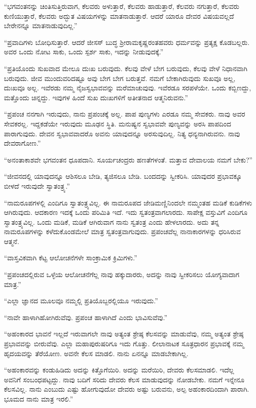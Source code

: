  “ಭಗವಂತನನ್ನು ಚಿಂತಿಸುತ್ತಿರುವಾಗ, ಕೆಲವರು ಅಳುತ್ತಾರೆ, ಕೆಲವರು ಹಾಡುತ್ತಾರೆ, ಕೆಲವರು ನಗುತ್ತಾರೆ, ಕೆಲವರು ಕುಣಿಯುತ್ತಾರೆ, ಕೆಲವರು ಅದ್ಭುತ ವಿಷಯಗಳನ್ನು ಮಾತನಾಡುತ್ತಾರೆ. ಆದರೆ ಯಾರೂ ದೇವರ ವಿಷಯವಲ್ಲದೆ ಬೇರೇನನ್ನೂ ಮಾತನಾಡುವುದಿಲ್ಲ.” 

 “ಪ್ರವಾದಿಗಳು ಬೋಧಿಸುತ್ತಾರೆ. ಆದರೆ ಜೀಸಸ್ ಬುದ್ಧ ಶ‍್ರೀರಾಮಕೃಷ್ಣರಂತಹ\break ವರು ಧರ್ಮವನ್ನು ಪ್ರತ್ಯಕ್ಷ ಕೊಡಬಲ್ಲರು. ಅವರ ಒಂದು ನೋಟ ಸಾಕು, ಒಂದು ಸ್ಪರ್ಶ ಸಾಕು, ಇದನ್ನು ನೀಡುವುದಕ್ಕೆ.” 

 “ಪ್ರತಿಯೊಂದು ಸುಖವಾದ ಮೇಲೂ ದುಃಖ ಬರುವುದು. ಕೆಲವು ವೇಳೆ ಬೇಗ ಬರುವುದು, ಕೆಲವು ವೇಳೆ ನಿಧಾನವಾಗಿ ಬರುವುದು. ಜೀವ ಮುಂದುವರಿದಷ್ಟೂ ಅವು ಬೇಗ ಬೇಗ ಬರುತ್ತವೆ. ನಮಗೆ ಬೇಕಾಗಿರುವುದು ಸುಖವೂ ಅಲ್ಲ, ದುಃಖವೂ ಅಲ್ಲ. ಇವೆರಡು ನಮ್ಮ ನೈಜಸ್ವಭಾವವನ್ನು ಮರೆಮಾಚುವುವು. ಇವೆರಡೂ ಸರಪಳೆಯೇ. ಒಂದು ಕಬ್ಬಿಣದ್ದು, ಮತ್ತೊಂದು ಚಿನ್ನದ್ದು. ಇವುಗಳ ಹಿಂದೆ ಸುಖ ದುಃಖಗಳಿಗೆ ಅತೀತನಾದ ಆತ್ಮನಿರುವನು.” 

 “ಪ್ರಪಂಚ ನನಗಾಗಿ ಇರುವುದು, ನಾನು ಪ್ರಪಂಚಕ್ಕೆ ಅಲ್ಲ. ಪಾಪ ಪುಣ್ಯಗಳು ಎರಡೂ ನಮ್ಮ ಸೇವಕರು. ನಾವು ಅವರ ಸೇವಕರಲ್ಲ. ಇದ್ದಕಡೆಯೇ ಇರುವುದು ಮೂಢನ ಸ್ಥಿತಿ. ಮನುಷ್ಯನ ಸ್ವಭಾವವೇ ಪುಣ್ಯವನ್ನು ಅರಸಿ ಪಾಪದಿಂದ ಪಾರಾಗುವುದು. ದೇವನ ಸ್ವಭಾವವಾದರೊ ಅವನು ಯಾವುದನ್ನೂ ಅರಸುವುದಿಲ್ಲ. ನಿತ್ಯ ಧನ್ಯನಾಗಿರುವನು. ನಾವು ದೇವರಾಗೋಣ.” 

 “ಅನಂತಾಕಾಶವೇ ಭಗವಂತನ ಧೂಪದಾನಿ. ಸೂರ್ಯಚಂದ್ರರು ಹಣತೆಗಳಂತೆ. ಮತ್ತಾವ ದೇವಾಲಯ ನಮಗೆ ಬೇಕು?” 

 “ಜೀವನದಲ್ಲಿ ಯಾವುದನ್ನೂ ಆಶಿಸಲೂ ಬೇಡಿ, ತ್ಯಜಿಸಲೂ ಬೇಡಿ. ಬಂದದನ್ನು ಸ್ವೀಕರಿಸಿ. ಯಾವುದರ ಪ್ರಭಾವಕ್ಕೂ ಬೀಳದೆ ಇರುವುದೇ ಸ್ವಾತಂತ್ರ್ಯ.” 

 “ನಾಮರೂಪಗಳಲ್ಲಿ ಎಂದಿಗೂ ಸ್ವಾತಂತ್ರ್ಯವಿಲ್ಲ. ಈ ನಾಮರೂಪದ ಜೇಡಿಮಣ್ಣಿನಿಂದಲೇ ನಮ್ಮಂತಹ ಮಡಿಕೆ ಕುಡಿಕೆಗಳು ಆಗಿರುವುದು. ಆದಕಾರಣ ಇದಕ್ಕೆ ಒಂದು ಪರಿಮಿತಿ ಇದೆ. ಇದು ಸ್ವತಂತ್ರವಾಗಲಾರದು. ಸಾಪೇಕ್ಷ ವಸ್ತುವಿಗೆ ಎಂದಿಗೂ ಸ್ವಾತಂತ್ರ್ಯವಿಲ್ಲ. ಒಂದು ಮಡಿಕೆ, ಮಡಿಕೆ ಆಗಿರುವಾಗ ನಾನು ಸ್ವತಂತ್ರ ಎಂದು ಹೇಳಲಾರದು. ಅದು ತನ್ನ ನಾಮರೂಪಗಳನ್ನು ಕಳೆದುಕೊಂಡಮೇಲೆ ಮಾತ್ರ ಸ್ವತಂತ್ರವಾಗುವುದು. ಪ್ರಪಂಚವೆಲ್ಲ ನಾನಾಕಾರಗಳನ್ನು ಧರಿಸಿರುವ ಆತ್ಮನೆ. 

 “ವಾಸ್ತವಿಕವಾಗಿ ಕೆಟ್ಟ ಆಲೋಚನೆಗಳೇ ಸಾಂಕ್ರಾಮಿಕ ಕ್ರಿಮಿಗಳು.” 

 “ಪ್ರಪಂಚದಲ್ಲಿರುವ ಒಳ್ಳೆಯ ಆಲೋಚನೆಗೆಲ್ಲ ನಾವು ಹಕ್ಕುದಾರರು, ಅದನ್ನು ನಾವು ಸ್ವೀಕರಿಸಲು ಯೋಗ್ಯವಾದಾಗ ಮಾತ್ರ.” 

 “ಎಲ್ಲಾ ಜ್ಞಾನದ ಮೂಲವೂ ನಮ್ಮಲ್ಲಿ ಪ್ರತಿಯೊಬ್ಬರಲ್ಲಿಯೂ ಇರುವುದು.” 

 “ನಾವೇ ಹಾಳಾಗಿಹೋಗಿರುವೆವು. ಪ್ರಪಂಚ ಹಾಳಾಗಿದೆ ಎಂದು ಭಾವಿಸುವೆವು.” 

 “ಅಹಂಕಾರದ ಭಾವನೆ ಇಲ್ಲದೆ ಇರುವಾಗಲೇ ನಾವು ಅತ್ಯಂತ ಶ್ರೇಷ್ಠ ಕೆಲಸವನ್ನು ಮಾಡುವೆವು, ನಮ್ಮ ಅತ್ಯಂತ ಶ್ರೇಷ್ಠ ಪ್ರಭಾವವನ್ನು ಬೀರುವೆವು. ಎಲ್ಲಾ ಮಹಾಪುರುಷರಿಗೂ ಇದು ಗೊತ್ತು. ಲೀಲಾನಾಟಕ ಸೂತ್ರಧಾರನ ಪ್ರಭಾವಕ್ಕೆ ನಮ್ಮ ಹೃದಯವನ್ನು ತೆರೆಯೋಣ. ಅವನೇ ಕೆಲಸ ಮಾಡಲಿ. ನಾನು ಏನನ್ನೂ ಮಾಡಬೇಕಾಗಿಲ್ಲ. 

 “ಅಹಂಕಾರವನ್ನು ಕಂಡುಹಿಡಿದು ಅದನ್ನು ಕಿತ್ತೊಗೆಯಿರಿ. ಅದನ್ನು ಮರೆಯಿರಿ, ದೇವರು ಕೆಲಸಮಾಡಲಿ. ಇದೆಲ್ಲ ಅವನಿಗೆ ಸಂಬಂಧಪಟ್ಟದ್ದು. ನಾವು ಬದಿಗೆ ಸರಿದು ದೇವರು ಕೆಲಸ ಮಾಡುವುದನ್ನು ನೋಡಬೇಕು. ನಮಗೆ ಇನ್ನೇನೂ ಕೆಲಸವಿಲ್ಲ. ನಾನು ಎಂಬುದು ಎಷ್ಟು ಹೋಗುವುದೋ ದೇವರು ಅಷ್ಟು ಬರುವನು, ಅಲ್ಪ ಅಹಂಕಾರದಿಂದಾಗಿ ಪಾರಾಗಿ. ಭೂಮದ ನಾನು ಮಾತ್ರ ಇರಲಿ.” 

